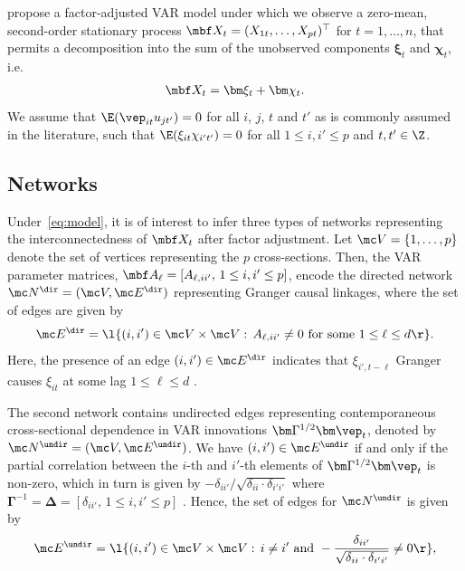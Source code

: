 \cite{barigozzi2022fnets} propose a factor-adjusted VAR model under which we observe a zero-mean, second-order stationary process $\mbf X_t = (X_{1t}, \ldots, X_{pt})^\top$ for $t = 1, \ldots, n$, that permits a decomposition into the sum of the unobserved components $\bm\xi_t$ and $\bm\chi_t$, i.e.\
\begin{align}
    \label{eq:model}
    \mbf X_t = \bm\xi_t + \bm\chi_t.
\end{align}
We assume that $\E(\vep_{it} u_{jt'}) = 0$ for all $i$, $j$, $t$ and $t'$ as is commonly assumed in the literature, such that $\E(\xi_{it} \chi_{i't'}) = 0$ for all $1 \le i, i' \le p$ and $t, t' \in \Z$.

\subsection{Networks}
\label{sec:networks}

Under~\eqref{eq:model}, it is of interest to infer three types of networks representing the interconnectedness of $\mbf X_t$ after factor adjustment. 
Let $\mc V = \{1, \ldots, p\}$ denote the set of vertices representing the $p$ cross-sections.
Then, the VAR parameter matrices, $\mbf A_\ell = [A_{\ell, ii'}, \, 1 \le i, i' \le p]$, encode the directed network $\mc N^{\dir} = (\mc V, \mc E^{\dir})$ representing Granger causal linkages, where the set of edges are given by
\begin{align}
\label{eq:net:dir}
\mc E^{\dir} = \l\{(i, i') \in \mc V \times \mc V: \, A_{\ell, ii'} \ne 0 \text{ for some } 1 \le \ell \le d \r\}.
\end{align}
Here, the presence of an edge $(i, i') \in \mc E^{\dir}$ indicates that $\xi_{i', t - \ell}$ Granger causes $\xi_{it}$ at some lag $1 \le \ell \le d$ \citep{dahlhaus2000graphical}.

The second network contains undirected edges representing contemporaneous cross-sectional dependence in VAR innovations $\bm\Gamma^{1/2} \bm\vep_t$, denoted by $\mc N^{\undir} = (\mc V, \mc E^{\undir})$.
We have $(i, i') \in \mc E^{\undir}$ if and only if the partial correlation between the $i$-th and $i'$-th elements of $\bm\Gamma^{1/2} \bm\vep_t$ is non-zero, which in turn is given by $- \delta_{ii'}/\sqrt{\delta_{ii} \cdot \delta_{i'i'}}$ where $\bm\Gamma^{-1} = \bm\Delta = [\delta_{ii'}, \, 1 \le i, i' \le p]$ \citep{peng2009partial}.
Hence, the set of edges for $\mc N^{\undir}$ is given by
\begin{align}
\label{eq:net:undir}
\mc E^{\undir} = \l\{ (i, i') \in \mc V \times \mc V: \, i \ne i' \text{ and }
- \frac{\delta_{ii'}}{\sqrt{\delta_{ii} \cdot \delta_{i'i'}}} \ne 0 \r\},
\end{align}


